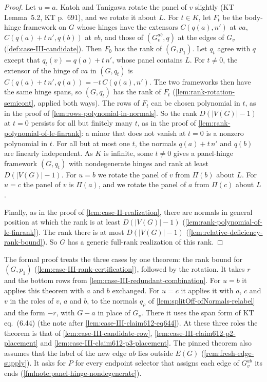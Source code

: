 \begin{proof}
  Let $u = a$. Katoh and Tanigawa rotate the panel of $v$ slightly (KT
  Lemma~5.2, KT p.~691), and we rotate it about
  $L$. For $t \in K$, let $F_t$ be the body-hinge framework on $G$ whose
  hinges have the extensors $C(q(a), n')$ at $va$,
  $C(q(a) + t\,n', q(b))$ at $vb$, and those of $(G_v^{ab}, q)$ at the
  edges of $G_v$ (\cref{def:case-III-candidate}). Then $F_0$ has the
  rank of $(G, p_1)$. Let $q_t$ agree with $q$ except that $q_t(v) = q(a) + t\,n'$, whose panel contains
  $L$. For $t \neq 0$, the extensor of the hinge of $va$ in $(G, q_t)$ is
  $C(q(a) + t\,n', q(a)) = -t\,C(q(a), n')$. The two frameworks then
  have the same hinge spans, so $(G, q_t)$ has the rank of $F_t$
  (\cref{lem:rank-rotation-semicont}, applied both ways). The rows of
  $F_t$ can be chosen polynomial in $t$, as in the
  proof of \cref{lem:rows-polynomial-in-normals}. So the rank
  $D(|V(G)| - 1)$ at $t = 0$ persists for all but finitely many $t$, as
  in the proof of \cref{lem:rank-polynomial-of-le-finrank}: a minor that
  does not vanish at $t = 0$ is a nonzero polynomial in $t$. For all but at most
  one $t$, the normals $q(a) + t\,n'$ and $q(b)$ are linearly
  independent. As $K$ is infinite, some $t \neq 0$ gives a panel-hinge
  framework $(G, q_t)$ with nondegenerate hinges and rank at least
  $D(|V(G)| - 1)$. For $u = b$ we rotate the panel of $v$ from $\Pi(b)$
  about $L$. For $u = c$ the panel of $v$ is $\Pi(a)$, and we rotate the
  panel of $a$ from $\Pi(c)$ about $L$.

  Finally, as in the proof of \cref{lem:case-II-realization}, there are
  normals in general position at which the rank is at least
  $D(|V(G)| - 1)$ (\cref{lem:rank-polynomial-of-le-finrank}). The rank
  there is at most $D(|V(G)| - 1)$
  (\cref{lem:relative-deficiency-rank-bound}). So $G$ has a generic
  full-rank realization of this rank.
\end{proof}

\begin{fmlnote}
  The formal proof treats the three cases by one theorem: the rank bound
  for $(G, p_1)$ (\cref{lem:case-III-rank-certification}), followed by
  the rotation. It takes $r$ and the bottom rows from
  \cref{lem:case-III-redundant-combination}. For $u = b$ it applies this
  theorem with $a$ and $b$ exchanged. For $u = c$ it applies it with $a$, $c$ and $v$ in
  the roles of $v$, $a$ and $b$, to the normals $q_\rho$ of
  \cref{lem:splitOff-ofNormals-relabel} and the form $-r$, with $G - a$
  in place of $G_v$. There it uses the span form of KT eq.~(6.44) (the
  note after \cref{lem:case-III-claim612-eq644}). At these three roles
  the theorem is that of \cref{lem:case-III-candidate-row},
  \cref{lem:case-III-claim612-p2-placement} and
  \cref{lem:case-III-claim612-p3-placement}. The pinned theorem also
  assumes that the label of the new edge $ab$ lies outside $E(G)$
  (\cref{rem:fresh-edge-supply}). It asks for $P$ for every endpoint
  selector that assigns each edge of $G_v^{ab}$ its ends
  (\cref{fmlnote:panel-hinge-nondegenerate}).
\end{fmlnote}

